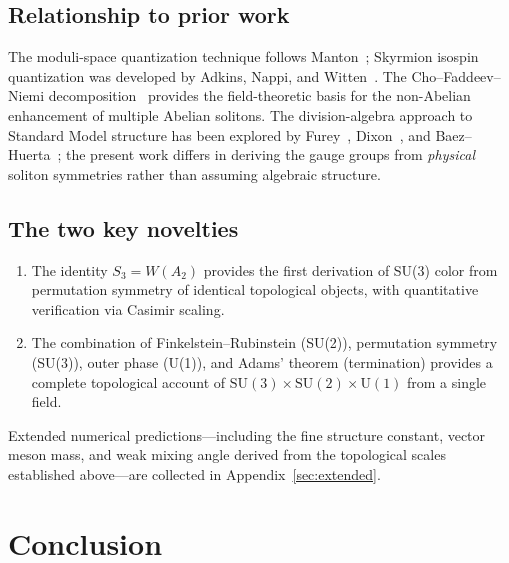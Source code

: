 \documentclass[a4paper,12pt]{article}
\begin{document}
\subsection{Relationship to prior work}

The moduli-space quantization technique follows
Manton~\cite{Manton1987}; Skyrmion isospin quantization was
developed by Adkins, Nappi, and Witten~\cite{ANW1983}. The
Cho--Faddeev--Niemi decomposition~\cite{Cho1980,FN1999} provides
the field-theoretic basis for the non-Abelian enhancement of multiple
Abelian solitons. The division-algebra approach to Standard Model
structure has been explored by Furey~\cite{Furey2018}, Dixon~\cite{Dixon1994},
and Baez--Huerta~\cite{Baez2010}; the present work differs in
deriving the gauge groups from \emph{physical} soliton symmetries
rather than assuming algebraic structure.

\subsection{The two key novelties}

\begin{enumerate}
 \item The identity $S_3 = W(A_2)$ provides the first derivation of
 SU(3) color from permutation symmetry of identical topological
 objects, with quantitative verification via Casimir scaling.
 \item The combination of Finkelstein--Rubinstein (SU(2)),
 permutation symmetry (SU(3)), outer phase (U(1)), and Adams'
 theorem (termination) provides a complete topological account of
 $\mathrm{SU}(3) \times \mathrm{SU}(2) \times \mathrm{U}(1)$
 from a single field.
\end{enumerate}

Extended numerical predictions---including the fine structure constant, vector meson mass, and weak mixing angle derived from the topological scales established above---are collected in Appendix~\ref{sec:extended}.

\section{Conclusion}
\label{sec:conclusion}
\end{document}
